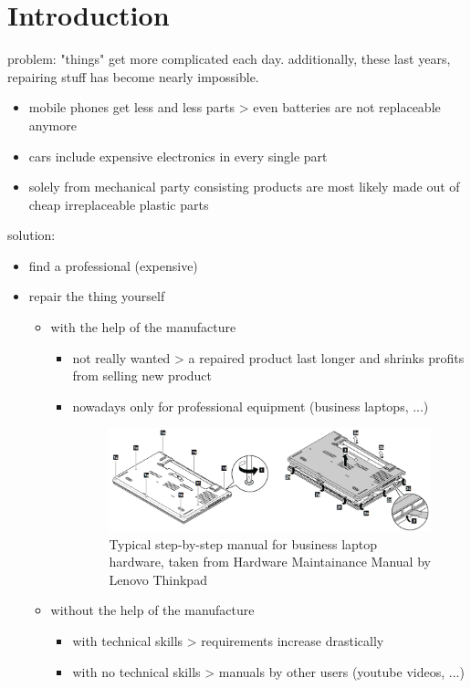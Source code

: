 
\chapter{Introduction}
	
	problem: "things" get more complicated each day. additionally, these last years, repairing stuff has become nearly impossible.
	
	\begin{itemize}
		\itemsep0em
		\item mobile phones get less and less parts > even batteries are not replaceable anymore
		\item cars include expensive electronics in every single part
		\item solely from mechanical party consisting products are most likely made out of cheap irreplaceable plastic parts
	\end{itemize}
	
	solution:
	\begin{itemize}
		\itemsep0em
		\item find a professional (expensive)
		\item repair the thing yourself \begin{itemize}
			\itemsep0em
			\item with the help of the manufacture \begin{itemize}
				\item not really wanted > a repaired product last longer and shrinks profits from selling new product
				\item nowadays only for professional equipment (business laptops, ...)
					\begin{figure}[H]
						\includegraphics[width=\textwidth]{../images/common-manual.png}
						\centering
						\caption[adsf]{Typical step-by-step manual for business laptop hardware, taken from Hardware Maintainance Manual by Lenovo Thinkpad\footnotemark}
					\end{figure}
			\end{itemize}
			\item without the help of the manufacture \begin{itemize}
				\itemsep0em
				\item with technical skills > requirements increase drastically
				\item with no technical skills > manuals by other users (youtube videos, ...)
			\end{itemize}
		\end{itemize}
	\end{itemize}
	
